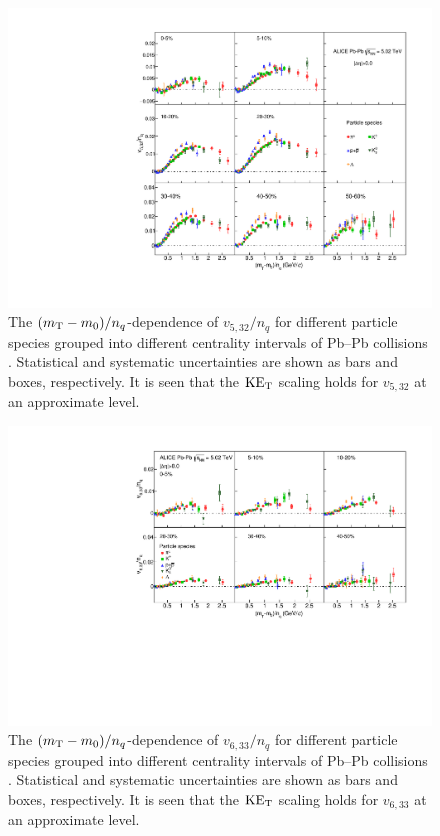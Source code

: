 \begin{figure}[htb]
\begin{center}
\includegraphics[scale=0.82]{figures/scaling/All_v523_gap00_KET_3by3.pdf}
\end{center}
\caption{The $(m_{\rm{T}} - m_{0})/n_{q}$-dependence of $v_{5,32}/n_{q}$ for different particle species grouped into different centrality intervals of Pb--Pb collisions \sNN. Statistical and systematic uncertainties are shown as bars and boxes, respectively. It is seen that the $\rm KE_{T}$ scaling holds for $v_{5,32}$ at an approximate level.}
\label{v523_KET}
\end{figure}

\begin{figure}[htb]
\begin{center}
\includegraphics[scale=0.82]{figures/scaling/All_v633_gap00_KET_3by2.pdf}
\end{center}
\caption{The $(m_{\rm{T}} - m_{0})/n_{q}$-dependence of $v_{6,33}/n_{q}$ for different particle species grouped into different centrality intervals of Pb--Pb collisions \sNN. Statistical and systematic uncertainties are shown as bars and boxes, respectively. It is seen that the $\rm KE_{T}$ scaling holds for $v_{6,33}$ at an approximate level.}
\label{v633_KET}
\end{figure}

